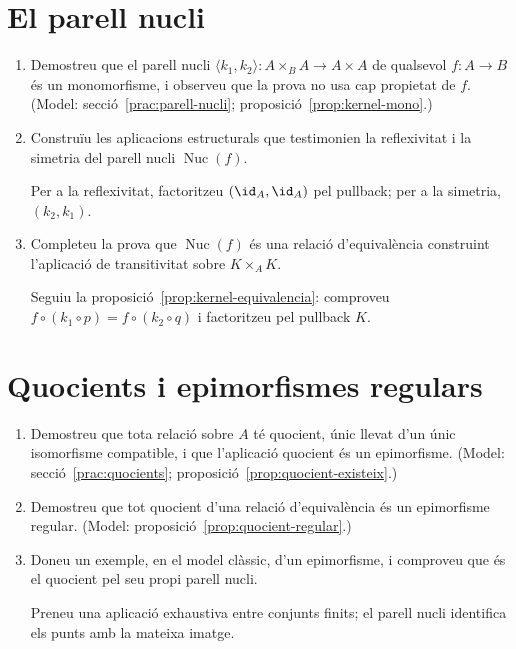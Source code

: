 \section{El parell nucli}

\begin{enumerate}[resume]
  \item Demostreu que el parell nucli \(\langle k_1,k_2\rangle\colon A\times_B A\to A\times A\) de qualsevol \(f\colon A\to B\) és un monomorfisme, i observeu que la prova no usa cap propietat de \(f\). (Model: secció~\ref{prac:parell-nucli}; proposició~\ref{prop:kernel-mono}.)

  \item Construïu les aplicacions estructurals que testimonien la reflexivitat i la simetria del parell nucli \(\operatorname{Nuc}(f)\). \begin{indicacio}Per a la reflexivitat, factoritzeu \((\id_A,\id_A)\) pel pullback; per a la simetria, \((k_2,k_1)\).\end{indicacio}

  \item Completeu la prova que \(\operatorname{Nuc}(f)\) és una relació d'equivalència construint l'aplicació de transitivitat sobre \(K\times_A K\). \begin{indicacio}Seguiu la proposició~\ref{prop:kernel-equivalencia}: comproveu \(f\circ(k_1\circ p)=f\circ(k_2\circ q)\) i factoritzeu pel pullback \(K\).\end{indicacio}
\end{enumerate}

\section{Quocients i epimorfismes regulars}

\begin{enumerate}[resume]
  \item Demostreu que tota relació sobre \(A\) té quocient, únic llevat d'un únic isomorfisme compatible, i que l'aplicació quocient és un epimorfisme. (Model: secció~\ref{prac:quocients}; proposició~\ref{prop:quocient-existeix}.)

  \item Demostreu que tot quocient d'una relació d'equivalència és un epimorfisme regular. (Model: proposició~\ref{prop:quocient-regular}.)

  \item Doneu un exemple, en el model clàssic, d'un epimorfisme, i comproveu que és el quocient pel seu propi parell nucli. \begin{indicacio}Preneu una aplicació exhaustiva entre conjunts finits; el parell nucli identifica els punts amb la mateixa imatge.\end{indicacio}
\end{enumerate}

